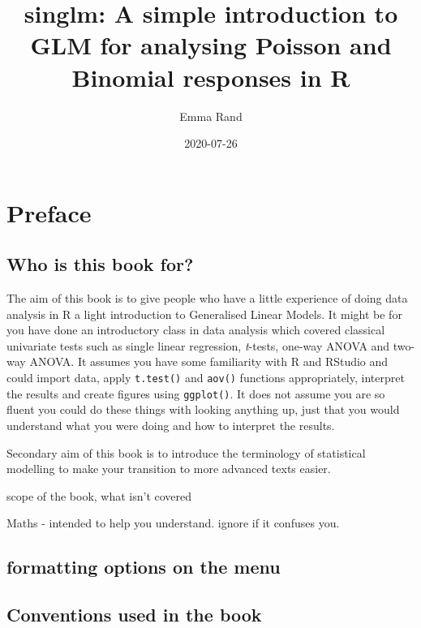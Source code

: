 \documentclass[
]{book}
\title{singlm: A simple introduction to GLM for analysing Poisson and Binomial responses in R}
\author{Emma Rand}
\date{2020-07-26}
\begin{document}
\maketitle

{
\setcounter{tocdepth}{1}
\tableofcontents
}
\hypertarget{preface}{%
\chapter*{Preface}\label{preface}}

\hypertarget{who-is-this-book-for}{%
\section{Who is this book for?}\label{who-is-this-book-for}}

The aim of this book is to give people who have a little experience of doing data analysis in R a light introduction to Generalised Linear Models.
It might be for you have done an introductory class in data analysis which covered classical univariate tests such as single linear regression, \emph{t}-tests, one-way ANOVA and two-way ANOVA. It assumes you have some familiarity with R and RStudio and could import data, apply \texttt{t.test()} and \texttt{aov()} functions appropriately, interpret the results and create figures using \texttt{ggplot()}. It does not assume you are so fluent you could do these things with looking anything up, just that you would understand what you were doing and how to interpret the results.

Secondary aim of this book is to introduce the terminology of statistical modelling to make your transition to more advanced texts easier.

scope of the book, what isn't covered

Maths - intended to help you understand. ignore if it confuses you.

\hypertarget{formatting-options-on-the-menu}{%
\section{formatting options on the menu}\label{formatting-options-on-the-menu}}

\hypertarget{conventions-used-in-the-book}{%
\section{Conventions used in the book}\label{conventions-used-in-the-book}}
\end{document}
